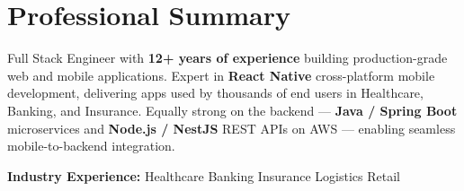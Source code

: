 
\section{Professional Summary}

Full Stack Engineer with \textbf{12+ years of experience} building production-grade web and mobile
applications. Expert in \textbf{React Native} cross-platform mobile development, delivering apps
used by thousands of end users in Healthcare, Banking, and Insurance. Equally strong on the backend
— \textbf{Java / Spring Boot} microservices and \textbf{Node.js / NestJS} REST APIs on AWS —
enabling seamless mobile-to-backend integration.

\vspace{4pt}
{\small\color{cvMuted}%
  \textbf{Industry Experience:}\enspace%
  Healthcare\enspace\textbar\enspace
  Banking\enspace\textbar\enspace
  Insurance\enspace\textbar\enspace
  Logistics\enspace\textbar\enspace
  Retail%
}
